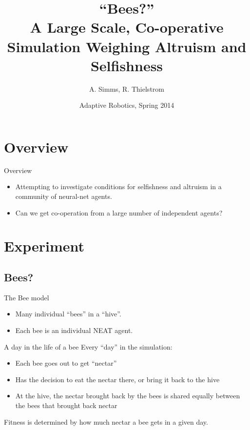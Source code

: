 \documentclass{beamer}
\title[Bees?]{``Bees?''\\ A Large Scale, Co-operative Simulation Weighing
                          Altruism and Selfishness}
\author{A. Simms, R. Thielstrom}
\institute{Swarthmore College}
\date{Adaptive Robotics, Spring 2014}
\begin{document}
	\begin{frame}
		\titlepage
	\end{frame}

	\begin{frame}
		\tableofcontents
	\end{frame}

	\section{Overview}

	\begin{frame}{Overview}
		\begin{itemize}
			\item Attempting to investigate conditions for selfishness and altruism in a community of neural-net agents.
			\item Can we get co-operation from a large number of independent agents?
		\end{itemize}
	\end{frame}

	\section{Experiment}

	\subsection{Bees?}
	\begin{frame}{The Bee model}
		\begin{itemize}
			\item Many individual ``bees'' in a ``hive''.
			\item Each bee is an individual NEAT agent.
		\end{itemize}
	\end{frame}

	\begin{frame}{A day in the life of a bee}
		Every ``day'' in the simulation:
		\begin{itemize}
			\item Each bee goes out to get ``nectar''
			\item Has the decision to eat the nectar there, or bring it back to the hive
			\item At the hive, the nectar brought back by the bees is shared equally between the bees that brought back nectar
		\end{itemize}
		Fitness is determined by how much nectar a bee gets in a given day.
	\end{frame}
\end{document}
